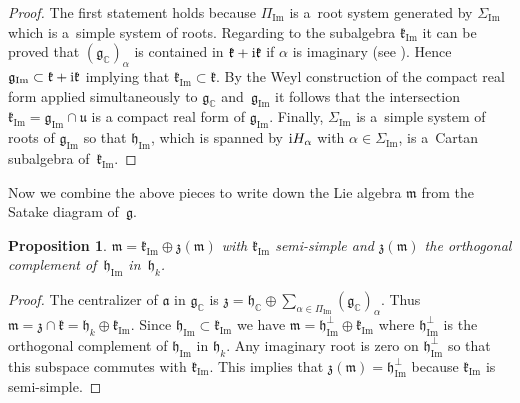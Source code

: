 \documentclass[10pt,a4paper]{amsart}
\numberwithin{equation}{section}
\newtheorem{Proposition}[Theorem]{Proposition}
 { \theoremstyle{definition}
\newtheorem{Definition}[Theorem]{Definition}
\newtheorem{Note}[Theorem]{Note}
\newtheorem{Example}[Theorem]{Example}
\newtheorem{Remark}[Theorem]{Remark} }
\newcommand{\func}[1]{\operatorname{#1}}
\begin{document}
\begin{proof}The first statement holds because $\Pi _{\func{Im}}$ is a~root system generated by $\Sigma _{\func{Im}}$ which is a~simple system of roots. Regarding to the subalgebra $\mathfrak{k}_{\func{Im}}$ it can be proved that $( \mathfrak{g}_{\mathbb{C}}) _{\alpha }$ is contained in $\mathfrak{k}+{\rm i}\mathfrak{k}$ if $\alpha $ is imaginary (see \cite[Lemma~14.6]{alglie}). Hence $\mathfrak{g}_{\func{Im}}\subset \mathfrak{k}+{\rm i}\mathfrak{k}$ implying that $\mathfrak{k}_{\func{Im}}\subset \mathfrak{k}$. By the Weyl construction of the compact real form applied simultaneously to $\mathfrak{g}_{\mathbb{C}} $ and~$\mathfrak{g}_{\func{Im}}$ it follows that the
intersection $\mathfrak{k}_{\func{Im}}=\mathfrak{g}_{\func{Im}}\cap \mathfrak{u}$ is a compact real form of $\mathfrak{g}_{\func{Im}}$. Finally, $\Sigma _{\func{Im}}$ is a~simple system of roots of $\mathfrak{g}_{\func{Im}}$ so that $\mathfrak{h}_{\func{Im}}$, which is spanned by ${\rm i}H_{\alpha }$ with $\alpha \in \Sigma _{\func{Im}}$, is a~Cartan subalgebra of~$\mathfrak{k}_{\func{Im}}$.
\end{proof}

Now we combine the above pieces to write down the Lie algebra $\mathfrak{m}$ from the Satake diagram of~$\mathfrak{g}$.

\begin{Proposition}\label{propSpanCenterm}$\mathfrak{m}=\mathfrak{k}_{\func{Im}}\oplus \mathfrak{z}(\mathfrak{m}) $ with $\mathfrak{k}_{\func{Im}}$ semi-simple and $\mathfrak{z}(\mathfrak{m}) $ the orthogonal complement of~$\mathfrak{h}_{\func{Im}}$ in~$\mathfrak{h}_{k}$.
\end{Proposition}

\begin{proof}The centralizer of $\mathfrak{a}$ in $\mathfrak{g}_{\mathbb{C}}$ is $\mathfrak{z}=\mathfrak{h}_{\mathbb{C}}\oplus \sum\limits_{\alpha \in \Pi _{\func{Im}}} ( \mathfrak{g}_{\mathbb{C}} ) _{\alpha }$. Thus $\mathfrak{m}=\mathfrak{z}\cap \mathfrak{k}=\mathfrak{h}_{k}\oplus \mathfrak{k}_{\func{Im}} $. Since $\mathfrak{h}_{\func{Im}}\subset \mathfrak{k}_{\func{Im}}$ we have $\mathfrak{m}=\mathfrak{h}_{\func{Im}}^{\bot }\oplus \mathfrak{k}_{\func{Im}}$ where $\mathfrak{h}_{\func{Im}}^{\bot }$ is the orthogonal complement of $\mathfrak{h}_{\func{Im}}$ in $\mathfrak{h}_{k}$. Any imaginary root is zero on $\mathfrak{h}_{\func{Im}}^{\bot }$ so that this subspace commutes with $\mathfrak{k}_{\func{Im}}$. This implies that $\mathfrak{z}(\mathfrak{m}) =\mathfrak{h}_{\func{Im}}^{\bot }$ because $\mathfrak{k}_{\func{Im}}$ is semi-simple.
\end{proof}
\end{document}
